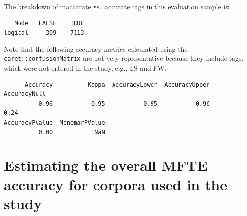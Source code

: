 \documentclass[
  letterpaper,
  DIV=11,
  numbers=noendperiod]{scrreprt}
\begin{document}
The breakdown of inaccurate vs.~accurate tags in this evaluation sample
is:

\begin{verbatim}
   Mode   FALSE    TRUE 
logical     309    7113 
\end{verbatim}

Note that the following accuracy metrics calculated using the
\texttt{caret::confusionMatrix} are not very representative because they
include tags, which were not entered in the study, e.g., LS and FW.

\begin{verbatim}
      Accuracy          Kappa  AccuracyLower  AccuracyUpper   AccuracyNull 
          0.96           0.95           0.95           0.96           0.24 
AccuracyPValue  McnemarPValue 
          0.00            NaN 
\end{verbatim}

\section{Estimating the overall MFTE accuracy for corpora used in the
study}\label{estimating-the-overall-mfte-accuracy-for-corpora-used-in-the-study}
\end{document}
